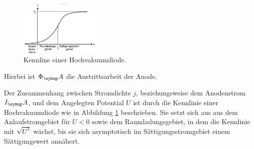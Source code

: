 \begin{figure}
  \includegraphics[width=4cm]{bilder/kennlinie.jpg}
  \caption{Kennline einer Hochvakuumdiode.\cite{504}}
  \label{kenn}
\end{figure}
Hierbei ist $\Phi_\su{A}$ die Austrittsarbeit der Anode.

Der Zusammenhang zwischen Stromdichte $j$, beziehungsweise dem Anodenstrom $I_\su{A}$,
und dem Angelegten Potential $U$ ist durch die Kennlinie einer Hochvakuumdiode
wie in Abbildung \ref{kenn} beschrieben.
Sie setzt sich aus aus dem Anlaufstromgebiet für $U<0$ sowie dem Raumladungsgebiet,
in dem die Kennlinie mit $\sqrt{U^3}$ wächst, bis sie sich asymptotisch im
Sättigungsstromgebiet einem Sättigungswert annähert.
